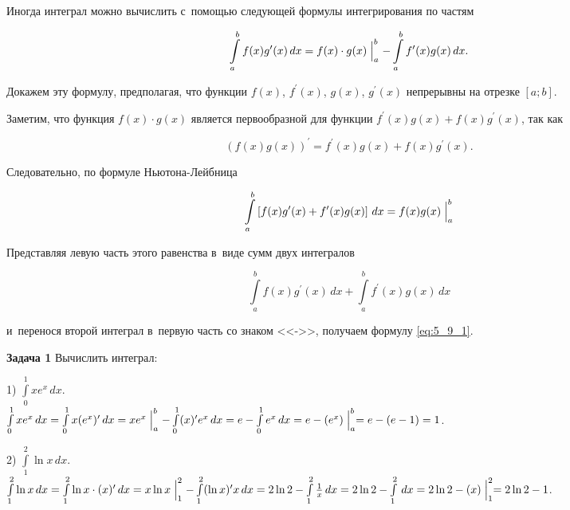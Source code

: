 
Иногда интеграл можно вычислить с~помощью следующей формулы интегрирования по частям

\begin{equation}\label{eq:5_9_1}
\int\limits_{a}^{b} f(x) g^\prime (x) \,dx = 
f(x) \cdot g(x) \Bigm|_{a}^{b} - \int\limits_{a}^{b} f^\prime (x) g(x) \,dx.
\end{equation}

Докажем эту формулу, предполагая, что функции $f(x)$, $f^\prime(x)$, $g(x)$, $g^\prime (x)$
непрерывны на отрезке $[a; b]$.

Заметим, что функция $f(x) \cdot g(x)$ является первообразной для функции
$f^\prime (x) g(x) + f(x) g^\prime (x)$, так как

\begin{equation*}
\left( f(x) g(x) \right)^\prime = f^\prime (x) g(x) + f(x) g^\prime (x). 
\end{equation*}

Следовательно, по формуле Ньютона-Лейбница

\begin{equation}\label{eq:5_9_2}
\int\limits_{a}^{b} \left[ f(x) g^\prime (x) + f^\prime (x) g(x) \right] \,dx =
f(x) g(x) \Bigm|_{a}^{b}
\end{equation}

Представляя левую часть этого равенства в~виде сумм двух интегралов

\begin{equation*}
\int\limits_{a}^{b} f(x) g^\prime (x) \,dx + 
\int\limits_{a}^{b} f^\prime (x) g(x) \,dx
\end{equation*}

\noindent
и~перенося второй интеграл в~первую часть со знаком <<->>,
получаем формулу \eqref{eq:5_9_1}.

\textbf{Задача 1}\label{ex:5_9_1} Вычислить интеграл:

1) $\int\limits_{0}^{1} xe^{x} \,dx$. \\
$\int\limits_{0}^{1} xe^{x} \,dx = \int\limits_{0}^{1} x (e^{x})^\prime \,dx =
xe^{x} \Bigm|_{a}^{b}  - \int\limits_{0}^{1}(x)^\prime e^{x} \,dx =
e - \int\limits_{0}^{1} e^{x} \,dx = e - (e^{x}) \Bigm|_{a}^{b} =
e - (e - 1) = 1$.

2) $\int\limits_{1}^{2} \ln x \,dx$. \\
$\int\limits_{1}^{2} \ln x \,dx = \int\limits_{1}^{2} \ln x \cdot (x)^\prime \,dx = 
x \ln x \Bigm|_{1}^{2} - \int\limits_{1}^{2} (\ln x)^\prime x \,dx = 
2 \ln 2 - \int\limits_{1}^{2} \frac{1}{x} \,dx =
2 \ln 2 - \int\limits_{1}^{2} \,dx =
2 \ln 2 - (x) \Bigm|_{1}^{2} = 2 \ln 2 - 1$.

